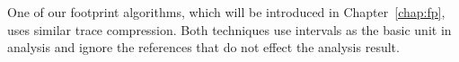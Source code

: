 One of our footprint algorithms, which will be introduced in
Chapter~\ref{chap:fp},  uses similar trace compression.
Both techniques use intervals as the basic unit in analysis 
and ignore the references that do not effect the analysis result.

